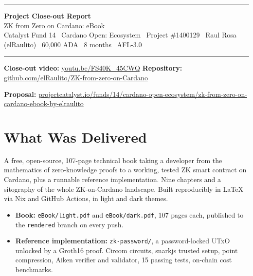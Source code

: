 \documentclass[10pt,a4paper]{article}
\newcommand{\repolink}{https://github.com/elRaulito/ZK-from-zero-on-Cardano}
\newcommand{\proplink}{https://projectcatalyst.io/funds/14/cardano-open-ecosystem/zk-from-zero-on-cardano-ebook-by-elraulito}
\begin{document}
{\color{accent}\rule{\textwidth}{2pt}}

\vspace{0.3em}
{\LARGE\bfseries Project Close-out Report}\\[0.15em]
{\large\color{muted} ZK from Zero on Cardano: eBook}\\[0.2em]
{\small Catalyst Fund 14 \textbullet\ Cardano Open: Ecosystem \textbullet\
Project \#1400129 \textbullet\ Raul Rosa (elRaulito) \textbullet\ 60,000 ADA
\textbullet\ 8 months \textbullet\ AFL-3.0}

{\color{accent}\rule{\textwidth}{0.8pt}}

\begin{keybox}
\textbf{Close-out video:} \href{https://youtu.be/FS40K_45CWQ}{youtu.be/FS40K\_45CWQ} \hfill
\textbf{Repository:} \href{\repolink}{github.com/elRaulito/ZK-from-zero-on-Cardano}

\textbf{Proposal:} \href{\proplink}{projectcatalyst.io/funds/14/cardano-open-ecosystem/zk-from-zero-on-cardano-ebook-by-elraulito}
\end{keybox}

\section{What Was Delivered}

A free, open-source, 107-page technical book taking a developer from the
mathematics of zero-knowledge proofs to a working, tested ZK smart contract on
Cardano, plus a runnable reference implementation. Nine chapters and a
sitography of the whole ZK-on-Cardano landscape. Built reproducibly in LaTeX via
Nix and GitHub Actions, in light and dark themes.

\vspace{-0.2em}
\begin{itemize}
  \item \textbf{Book:} \texttt{eBook/light.pdf} and \texttt{eBook/dark.pdf}, 107
        pages each, published to the \texttt{rendered} branch on every push.
  \item \textbf{Reference implementation:} \texttt{zk-password/}, a
        password-locked UTxO unlocked by a Groth16 proof. Circom circuits,
        snarkjs trusted setup, point compression, Aiken verifier and validator,
        15 passing tests, on-chain cost benchmarks.
\end{itemize}

\end{document}

